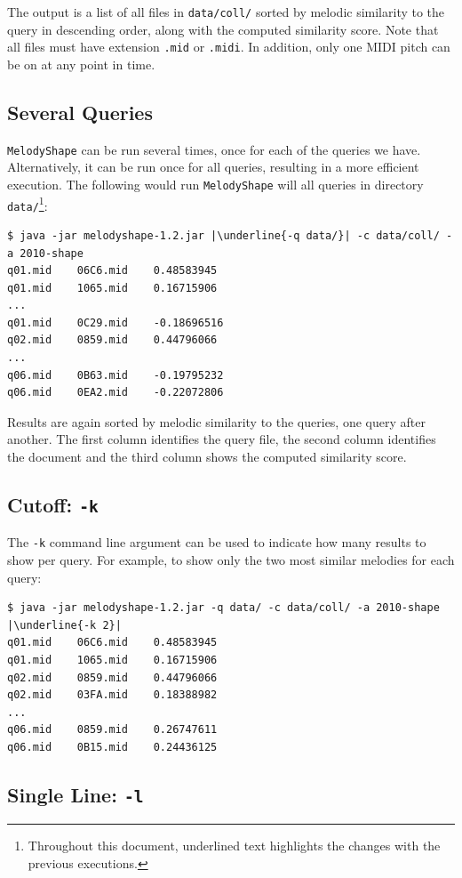 \documentclass[twoside]{article}
\begin{document}
The output is a list of all files in \texttt{data/coll/} sorted by melodic similarity to the query in descending order, along with the computed similarity score. Note that all files must have extension \texttt{.mid} or \texttt{.midi}. In addition, only one MIDI pitch can be on at any point in time.

\subsection{Several Queries}

\texttt{MelodyShape} can be run several times, once for each of the queries we have. Alternatively, it can be run once for all queries, resulting in a more efficient execution. The following would run \texttt{MelodyShape} will all queries in directory \texttt{data/}\footnote{Throughout this document, underlined text highlights the changes with the previous executions.}:
\begin{lstlisting}
$ java -jar melodyshape-1.2.jar |\underline{-q data/}| -c data/coll/ -a 2010-shape
q01.mid    06C6.mid    0.48583945
q01.mid    1065.mid    0.16715906
...
q01.mid    0C29.mid    -0.18696516
q02.mid    0859.mid    0.44796066
...
q06.mid    0B63.mid    -0.19795232
q06.mid    0EA2.mid    -0.22072806
\end{lstlisting}

Results are again sorted by melodic similarity to the queries, one query after another. The first column identifies the query file, the second column identifies the document and the third column shows the computed similarity score.

\subsection{Cutoff: \texttt{-k}}

The \texttt{-k} command line argument can be used to indicate how many results to show per query. For example, to show only the two most similar melodies for each query:
\begin{lstlisting}
$ java -jar melodyshape-1.2.jar -q data/ -c data/coll/ -a 2010-shape |\underline{-k 2}|
q01.mid    06C6.mid    0.48583945
q01.mid    1065.mid    0.16715906
q02.mid    0859.mid    0.44796066
q02.mid    03FA.mid    0.18388982
...
q06.mid    0859.mid    0.26747611
q06.mid    0B15.mid    0.24436125
\end{lstlisting}

\subsection{Single Line: \texttt{-l}}
\end{document}
